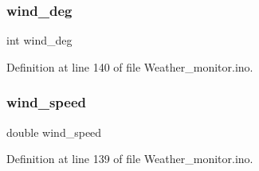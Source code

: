 \subsubsection{\texorpdfstring{wind\+\_\+deg}{wind\_deg}}
{\footnotesize\ttfamily int wind\+\_\+deg}



Definition at line 140 of file Weather\+\_\+monitor.\+ino.

\mbox{\label{_weather__monitor_8ino_a01a62de6de3acaa68a34a386b9c374a7}} 
\subsubsection{\texorpdfstring{wind\+\_\+speed}{wind\_speed}}
{\footnotesize\ttfamily double wind\+\_\+speed}



Definition at line 139 of file Weather\+\_\+monitor.\+ino.


